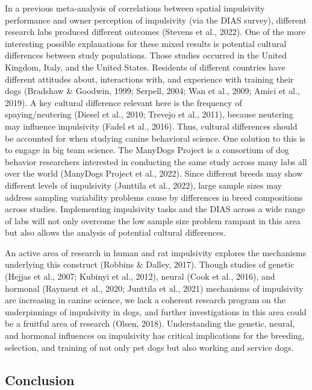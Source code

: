 \documentclass[
  ,pub,floatsintext]{apa6}
\begin{document}
In a previous meta-analysis of correlations between spatial impulsivity performance and owner perception of impulsivity (via the DIAS survey), different research labs produced different outcomes (Stevens et al., 2022). One of the more interesting possible explanations for these mixed results is potential cultural differences between study populations. Those studies occurred in the United Kingdom, Italy, and the United States. Residents of different countries have different attitudes about, interactions with, and experience with training their dogs (Bradshaw \& Goodwin, 1999; Serpell, 2004; Wan et al., 2009; Amici et al., 2019). A key cultural difference relevant here is the frequency of spaying/neutering (Diesel et al., 2010; Trevejo et al., 2011), because neutering may influence impulsivity (Fadel et al., 2016). Thus, cultural differences should be accounted for when studying canine behavioral science. One solution to this is to engage in big team science. The ManyDogs Project is a consortium of dog behavior researchers interested in conducting the same study across many labs all over the world (ManyDogs Project et al., 2022). Since different breeds may show different levels of impulsivity (Junttila et al., 2022), large sample sizes may address sampling variability problems cause by differences in breed compositions across studies. Implementing impulsivity tasks and the DIAS across a wide range of labs will not only overcome the low sample size problem rampant in this area but also allows the analysis of potential cultural differences.

An active area of research in human and rat impulsivity explores the mechanisms underlying this construct (Robbins \& Dalley, 2017). Though studies of genetic (Hejjas et al., 2007; Kubinyi et al., 2012), neural (Cook et al., 2016), and hormonal (Rayment et al., 2020; Junttila et al., 2021) mechanisms of impulsivity are increasing in canine science, we lack a coherent research program on the underpinnings of impulsivity in dogs, and further investigations in this area could be a fruitful area of research (Olsen, 2018). Understanding the genetic, neural, and hormonal influences on impulsivity has critical implications for the breeding, selection, and training of not only pet dogs but also working and service dogs.

\hypertarget{conclusion}{%
\subsection{Conclusion}\label{conclusion}}
\end{document}
